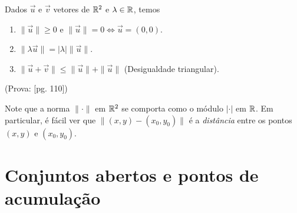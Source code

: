 \begin{theorem}
    Dados \(\overrightarrow{u}\) e \(\overrightarrow{v}\) vetores de \(\mathbb{R}^2\) e \(\lambda\in\mathbb{R}\), temos
        \begin{enumerate}
            \item \(\|\overrightarrow{u}\| \geq 0\) e \(\|\overrightarrow{u}\| = 0 \Leftrightarrow \overrightarrow{u} = (0,0)\).
            \item \(\|\lambda\overrightarrow{u}\| = |\lambda|\|\overrightarrow{u}\|.\)
            \item \(\|\overrightarrow{u}+\overrightarrow{v}\| \leq \|\overrightarrow{u}\| + \|\overrightarrow{u}\|\) (Desigualdade triangular).
        \end{enumerate}
\end{theorem}
(Prova: \cite{guidorizzi}[pg. 110])

Note que a norma \(\|\cdot\|\) em \(\mathbb{R}^2\) se comporta como o módulo \(|\cdot|\) em \(\mathbb{R}\). Em particular, é fácil ver que \(\|(x,y) - (x_0,y_0)\|\) é a \textit{distância} entre os pontos \((x,y)\) e \((x_0,y_0)\).

\section{Conjuntos abertos e pontos de acumulação}

